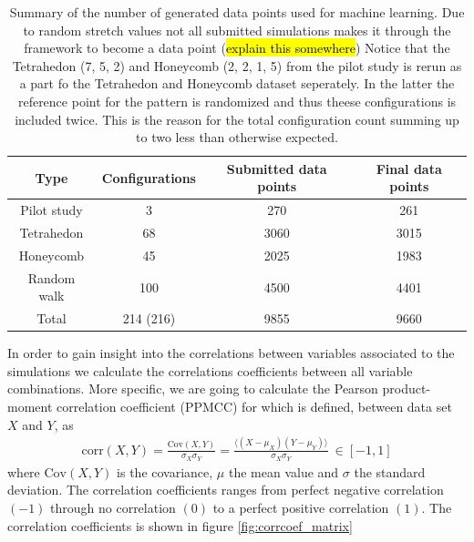 \begin{table}[H]
  \begin{center}
  \caption{Summary of the number of generated data points used for machine learning. Due to random stretch values not all submitted simulations makes it through the framework to become a data point (\hl{explain this somewhere})  Notice that the Tetrahedon (7, 5, 2) and Honeycomb (2, 2, 1, 5) from the pilot study is rerun as a part fo the Tetrahedon and Honeycomb dataset seperately. In the latter the reference point for the pattern is randomized and thus theese configurations is included twice. This is the reason for the total configuration count summing up to two less than otherwise expected. }
  \label{tab:dataset_summary}
  \begin{tabular}{ | c | c | c | c |} \hline
  \textbf{Type} & \textbf{Configurations} & \textbf{Submitted data points} & \textbf{Final data points} \\ \hline
  Pilot study & 3 & 270 & 261    \\ \hline
  Tetrahedon & 68 & 3060 & 3015  \\ \hline
  Honeycomb & 45 & 2025 & 1983  \\ \hline
  Random walk & 100 & 4500 & 4401 \\ \hline \hline
  Total & 214 (216) & 9855 & 9660 \\ \hline
  \end{tabular}
  \end{center}
\end{table}


In order to gain insight into the correlations between variables associated to the simulations we calculate the correlations coefficients between all variable combinations. More specific, we are going to calculate the Pearson product-moment correlation coefficient (PPMCC) for which is defined, between data set $X$ and $Y$, as
\begin{align*}
  \mathrm{corr}(X,Y) = \frac{\mathrm{Cov}(X,Y)}{\sigma_X \sigma_Y} = \frac{\langle (X - \mu_X)(Y - \mu_Y)\rangle}{\sigma_X \sigma_Y} \ \in [-1, 1]
\end{align*}
where $\mathrm{Cov}(X,Y)$ is the covariance, $\mu$ the mean value and $\sigma$ the standard deviation. The correlation coefficients ranges from perfect negative correlation $(-1)$ through no correlation $(0)$ to a perfect positive correlation $(1)$. The correlation coefficients is shown in figure \ref{fig:corrcoef_matrix}

